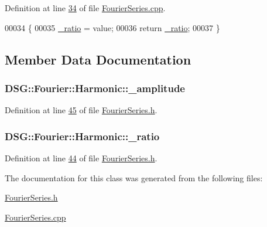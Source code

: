 Definition at line \hyperlink{_fourier_series_8cpp_source_l00034}{34} of file \hyperlink{_fourier_series_8cpp_source}{Fourier\+Series.\+cpp}.


\begin{DoxyCode}
00034                                                                       \{
00035     \hyperlink{class_d_s_g_1_1_fourier_1_1_harmonic_aa7138674df42fea66287ea31275bb14a}{\_ratio} = value;
00036     \textcolor{keywordflow}{return} \hyperlink{class_d_s_g_1_1_fourier_1_1_harmonic_aa7138674df42fea66287ea31275bb14a}{\_ratio};
00037 \}
\end{DoxyCode}


\subsection{Member Data Documentation}
\hypertarget{class_d_s_g_1_1_fourier_1_1_harmonic_a76156f1ce5ccf45a9d4bfab38e932dfb}{
\subsubsection[{\+\_\+amplitude}]{ D\+S\+G\+::\+Fourier\+::\+Harmonic\+::\+\_\+amplitude\hspace{0.3cm}{\ttfamily [protected]}}}\label{class_d_s_g_1_1_fourier_1_1_harmonic_a76156f1ce5ccf45a9d4bfab38e932dfb}


Definition at line \hyperlink{_fourier_series_8h_source_l00045}{45} of file \hyperlink{_fourier_series_8h_source}{Fourier\+Series.\+h}.

\hypertarget{class_d_s_g_1_1_fourier_1_1_harmonic_aa7138674df42fea66287ea31275bb14a}{
\subsubsection[{\+\_\+ratio}]{ D\+S\+G\+::\+Fourier\+::\+Harmonic\+::\+\_\+ratio\hspace{0.3cm}{\ttfamily [protected]}}}\label{class_d_s_g_1_1_fourier_1_1_harmonic_aa7138674df42fea66287ea31275bb14a}


Definition at line \hyperlink{_fourier_series_8h_source_l00044}{44} of file \hyperlink{_fourier_series_8h_source}{Fourier\+Series.\+h}.



The documentation for this class was generated from the following files\+:\begin{DoxyCompactItemize}
\item 
\hyperlink{_fourier_series_8h}{Fourier\+Series.\+h}\item 
\hyperlink{_fourier_series_8cpp}{Fourier\+Series.\+cpp}\end{DoxyCompactItemize}
